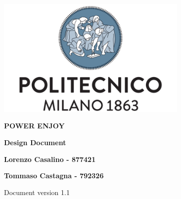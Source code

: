 \begin{titlepage}
	\begin{center}
		\includegraphics[width=350px]{../Datas/images/polimi.png}

		\vspace*{2.0cm}

		{\Huge \textbf{POWER ENJOY}\par}

		\vspace*{1.0cm}

		{\LARGE \textbf{Design Document}\par}

		\vspace*{2.0cm}

		{\normalsize
		\textbf{Lorenzo Casalino - 877421}\par
		\textbf{Tommaso Castagna - 792326}\par
		}

		\vfill
		Document version 1.1
	\end{center}
\end{titlepage}
